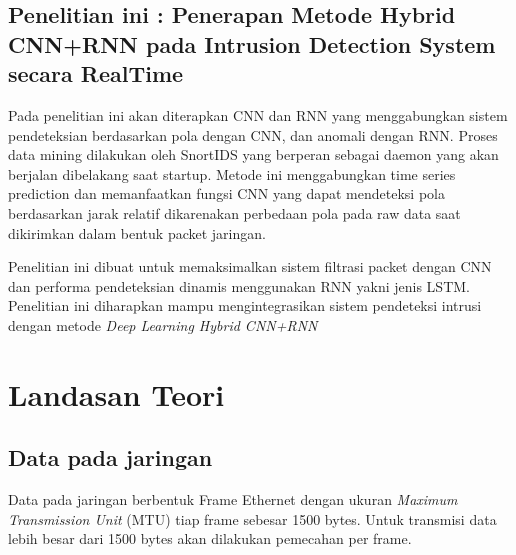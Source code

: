 \documentclass[./skripsi.tex]{subfiles}
\begin{document}
\subsection{Penelitian ini : Penerapan Metode Hybrid CNN+RNN pada Intrusion Detection System secara RealTime}
\par Pada penelitian ini akan diterapkan CNN dan RNN yang menggabungkan sistem pendeteksian berdasarkan pola dengan CNN, dan anomali dengan RNN. Proses data mining dilakukan oleh SnortIDS yang berperan sebagai daemon yang akan berjalan dibelakang saat startup. Metode ini menggabungkan time series prediction dan memanfaatkan fungsi CNN yang dapat mendeteksi pola berdasarkan jarak relatif dikarenakan perbedaan pola pada raw data saat dikirimkan dalam bentuk packet jaringan.
\par Penelitian ini dibuat untuk memaksimalkan sistem filtrasi packet dengan CNN dan performa pendeteksian dinamis menggunakan RNN yakni jenis LSTM. Penelitian ini diharapkan mampu mengintegrasikan sistem pendeteksi intrusi dengan metode \textit{Deep Learning Hybrid CNN+RNN}
\section{Landasan Teori}
\subsection{Data pada jaringan}
Data pada jaringan berbentuk Frame Ethernet dengan ukuran \textit{Maximum Transmission Unit} (MTU) tiap frame sebesar 1500 bytes. Untuk transmisi data lebih besar dari 1500 bytes akan dilakukan pemecahan per frame.
\end{document}
